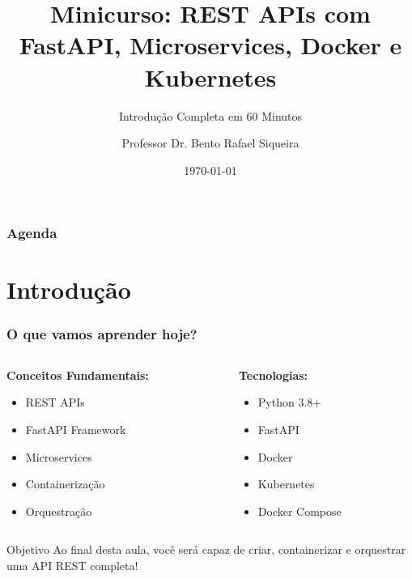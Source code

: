 \documentclass[aspectratio=169]{beamer}
\title[Minicurso REST API]{Minicurso: REST APIs com FastAPI, Microservices, Docker e Kubernetes}
\subtitle{Introdução Completa em 60 Minutos}
\author{Professor Dr. Bento Rafael Siqueira}
\institute{UFLA - Universidade Federal de Lavras}
\date{\today}
\begin{document}
\begin{frame}
    \titlepage
\end{frame}

\begin{frame}
    \frametitle{Agenda}
    \tableofcontents
\end{frame}

\section{Introdução}

\begin{frame}
    \frametitle{O que vamos aprender hoje?}
    \begin{columns}
        \begin{column}{0.5\textwidth}
            \textbf{Conceitos Fundamentais:}
            \begin{itemize}
                \item REST APIs
                \item FastAPI Framework
                \item Microservices
                \item Containerização
                \item Orquestração
            \end{itemize}
        \end{column}
        \begin{column}{0.5\textwidth}
            \textbf{Tecnologias:}
            \begin{itemize}
                \item Python 3.8+
                \item FastAPI
                \item Docker
                \item Kubernetes
                \item Docker Compose
            \end{itemize}
        \end{column}
    \end{columns}
    
    \vspace{1em}
    \begin{alertblock}{Objetivo}
        Ao final desta aula, você será capaz de criar, containerizar e orquestrar uma API REST completa!
    \end{alertblock}
\end{frame}
\end{document}
